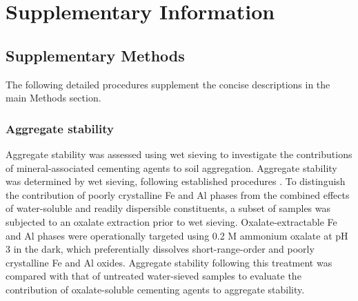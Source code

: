 \documentclass[preprint,12pt]{elsarticle}
\begin{document}
\clearpage



\clearpage
\section{Supplementary Information}
\label{sec:si}

\setcounter{figure}{0}
\setcounter{table}{0}
\setcounter{equation}{0}

\renewcommand{\thesection}{S\arabic{section}}
\renewcommand{\thefigure}{S\arabic{figure}}
\renewcommand{\thetable}{S\arabic{table}}
\renewcommand{\theequation}{S\arabic{equation}}



\subsection{Supplementary Methods}
\label{sec:si_methods}

The following detailed procedures supplement the concise descriptions in the main Methods section.

\subsubsection{Aggregate stability}

Aggregate stability was assessed using wet sieving to investigate the contributions of mineral-associated cementing agents to soil aggregation. Aggregate stability was determined by wet sieving, following established procedures \citep{KemperRosenau2018}. To distinguish the contribution of poorly crystalline Fe and Al phases from the combined effects of water-soluble and readily dispersible constituents, a subset of samples was subjected to an oxalate extraction prior to wet sieving. Oxalate-extractable Fe and Al phases were operationally targeted using 0.2 M ammonium oxalate at pH 3 in the dark, which preferentially dissolves short-range-order and poorly crystalline Fe and Al oxides. Aggregate stability following this treatment was compared with that of untreated water-sieved samples to evaluate the contribution of oxalate-soluble cementing agents to aggregate stability.
\end{document}
